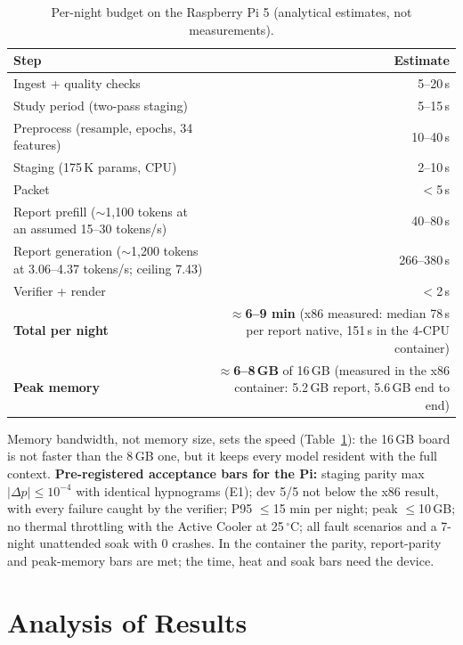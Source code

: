 \begin{table}[htbp]
\centering\small
\caption{Per-night budget on the Raspberry Pi 5 (analytical estimates, not measurements).}
\label{tab:budget}
\begin{tabular}{lr}
\toprule
Step & Estimate \\
\midrule
Ingest + quality checks & 5--20\,s \\
Study period (two-pass staging) & 5--15\,s \\
Preprocess (resample, epochs, 34 features) & 10--40\,s \\
Staging (175\,K params, CPU) & 2--10\,s \\
Packet & $<$5\,s \\
Report prefill ($\sim$1,100 tokens at an assumed 15--30 tokens/s) & 40--80\,s \\
Report generation ($\sim$1,200 tokens at 3.06--4.37 tokens/s; ceiling 7.43) & 266--380\,s \\
Verifier + render & $<$2\,s \\
\midrule
\textbf{Total per night} & \textbf{$\approx$6--9 min} (x86 measured: median 78\,s per report native, 151\,s in the 4-CPU container) \\
\textbf{Peak memory} & \textbf{$\approx$6--8\,GB} of 16\,GB (measured in the x86 container: 5.2\,GB report, 5.6\,GB end to end) \\
\bottomrule
\end{tabular}
\end{table}

Memory bandwidth, not memory size, sets the speed (Table~\ref{tab:budget}): the 16\,GB board is not faster than the
8\,GB one, but it keeps every model resident with the full context. \textbf{Pre-registered acceptance bars for the
Pi:} staging parity max $|\Delta p| \le 10^{-4}$ with identical hypnograms (E1); dev 5/5 not below the x86 result,
with every failure caught by the verifier; P95 $\le$15 min per night; peak $\le$10\,GB; no thermal throttling with
the Active Cooler at 25\,$^\circ$C; all fault scenarios and a 7-night unattended soak with 0 crashes. In the container the
parity, report-parity and peak-memory bars are met; the time, heat and soak bars need the device.

\section{ Analysis of Results}

